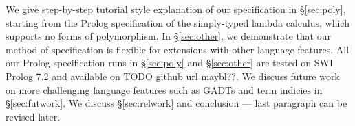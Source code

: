 We give step-by-step tutorial style explanation of our specification in
\S\ref{sec:poly}, starting from the Prolog specification of
the simply-typed lambda calculus, which supports no forms of polymorphism.
In \S\ref{sec:other}, we demonstrate that our method of specification is
flexible for extensions with other language features.
All our Prolog specification runs in \S\ref{sec:poly} and \S\ref{sec:other}
are tested on SWI Prolog 7.2 and available on TODO github url maybl??.
We discuss future work
on more challenging language features such as GADTs and term indicies in
\S\ref{sec:futwork}. We discuss \S\ref{sec:relwork} and
conclusion --- last paragraph can be revised later.




